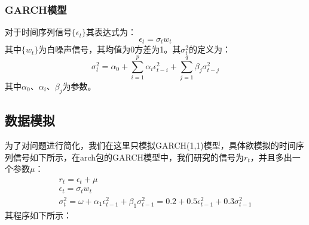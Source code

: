 \documentclass{article}
\begin{document}
\subsubsection{GARCH模型}
对于时间序列信号$\{ \epsilon _{t} \}$其表达式为：
\begin{equation}
\epsilon _{t} = \sigma _{t} w_{t}
\label{e000054}
\end{equation}
其中$\{ w_{t} \}$为白噪声信号，其均值为0方差为1。其$\sigma _{t}^{2}$的定义为：
\begin{equation}
\sigma _{t}^{2} = \alpha _{0} + \sum_{i=1}^{p} \alpha _{i} \epsilon _{t-i}^{2} + \sum_{j=1}^{q} \beta _{j} \sigma _{t-j}^{2}
\label{e000055}
\end{equation}
其中$\alpha _{0}$、$\alpha _{i}$、$\beta _{j}$为参数。
\subsection{数据模拟}
为了对问题进行简化，我们在这里只模拟GARCH(1,1)模型，具体欲模拟的时间序列信号如下所示，在arch包的GARCH模型中，我们研究的信号为$r_{t}$，并且多出一个参数$\mu$：
\begin{equation}
\begin{aligned}
r_{t} = \epsilon _{t} + \mu \\
\epsilon _{t} = \sigma _{t}w_{t} \\
\sigma _{t}^{2} = \omega + \alpha _{1} \epsilon _{t-1}^{2} + \beta _{1} \sigma _{t-1}^{2}=0.2 + 0.5\epsilon _{t-1}^{2} + 0.3\sigma _{t-1}^{2}
\end{aligned}
\label{e000056}
\end{equation}
其程序如下所示：
\end{document}

